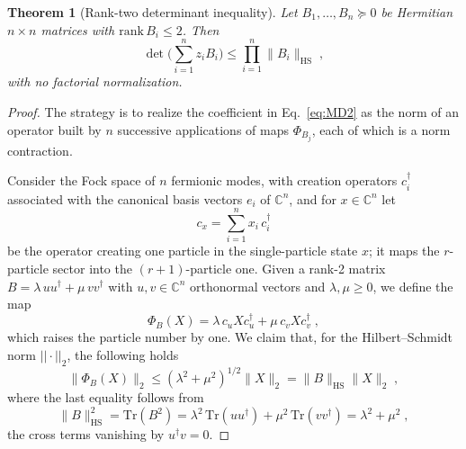 \documentclass[prx,twocolumn,superscriptaddress,aps,10pt, frontmatterverbose, reprint,footinbib,longbibliography=true]{revtex4-2}
\newtheorem{theorem}{Theorem}
\begin{document}
\begin{theorem}[Rank-two determinant inequality]
\label{thm:MD2}
Let $B_1,\dots,B_n\succeq0$ be Hermitian $n\times n$ matrices with $\mathrm{rank}\,B_i\le2$. Then
\begin{equation}
    [z_1\cdots z_n]\det\!\Big(\sum_{i=1}^nz_iB_i\Big)\le\prod_{i=1}^n\|B_i\|_{\mathrm{HS}}\;,
    \label{eq:MD2}
\end{equation}
with no factorial normalization.
\end{theorem}

\begin{proof}
The strategy is to realize the coefficient in Eq.~\eqref{eq:MD2} as the norm of an operator built by $n$ successive applications of maps $\Phi_{B_j}$, each of which is a norm contraction.

Consider the Fock space of $n$ fermionic modes, with creation operators $c_i^\dagger$ associated with the canonical basis vectors $e_i$ of $\mathbb{C}^n$, and for $x\in\mathbb{C}^n$ let
\begin{equation}
  c_x=\sum_{i=1}^n x_i\,c_i^\dagger
\end{equation} 
be the operator creating one particle in the single-particle state $x$; it maps the $r$-particle sector into the $(r+1)$-particle one. Given a rank-2 matrix $B=\lambda\,uu^\dagger+\mu\,vv^\dagger$ with $u,v \in \mathbb{C}^n$ orthonormal vectors and $\lambda,\mu\ge0$, we define the map
\begin{equation}
    \Phi_B(X)=\lambda\,c_uXc_u^\dagger+\mu\,c_vXc_v^\dagger\;,
\end{equation}
which raises the particle number by one.
We claim that, for the Hilbert--Schmidt norm $||\cdot||_2$, the following holds
\begin{equation}\|\Phi_B(X)\|_{2}\le(\lambda^2+\mu^2)^{1/2}\|X\|_{2}=\|B\|_{\mathrm{HS}}\|X\|_{2}\;,
    \label{eq:Phi-contraction}
\end{equation}
where the last equality follows from
\begin{equation}
    \|B\|_{\mathrm{HS}}^2=\mathrm{Tr}(B^2)=\lambda^2\,\mathrm{Tr}(uu^\dagger)+\mu^2\,\mathrm{Tr}(vv^\dagger)=\lambda^2+\mu^2\;,\end{equation}
the cross terms vanishing by $u^\dagger v=0$.


\end{proof}
\end{document}

